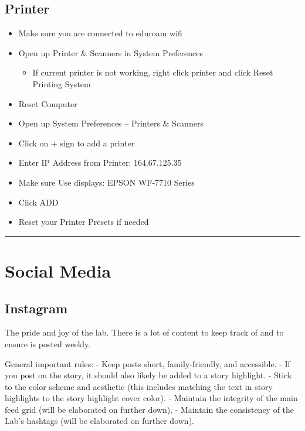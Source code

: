 \documentclass[]{book}
\providecommand{\tightlist}{%
  \setlength{\itemsep}{0pt}\setlength{\parskip}{0pt}}
\begin{document}
\hypertarget{printer}{%
\subsection{Printer}\label{printer}}

\begin{itemize}
\tightlist
\item
  Make sure you are connected to eduroam wifi
\item
  Open up Printer \& Scanners in System Preferences

  \begin{itemize}
  \tightlist
  \item
    If current printer is not working, right click printer and click Reset Printing System
  \end{itemize}
\item
  Reset Computer
\item
  Open up System Preferences -- Printers \& Scanners
\item
  Click on + sign to add a printer
\item
  Enter IP Address from Printer: 164.67.125.35
\item
  Make sure Use displays: EPSON WF-7710 Series
\item
  Click ADD
\item
  Reset your Printer Presets if needed
\end{itemize}

\begin{center}\rule{0.5\linewidth}{\linethickness}\end{center}

\hypertarget{social-media}{%
\section{Social Media}\label{social-media}}

\hypertarget{instagram}{%
\subsection{Instagram}\label{instagram}}

The pride and joy of the lab. There is a lot of content to keep track of and to ensure is posted weekly.

General important rules:
- Keep posts short, family-friendly, and accessible.
- If you post on the story, it should also likely be added to a story highlight.
- Stick to the color scheme and aesthetic (this includes matching the text in story highlights to the story highlight cover color).
- Maintain the integrity of the main feed grid (will be elaborated on further down).
- Maintain the consistency of the Lab's hashtags (will be elaborated on further down).
\end{document}
